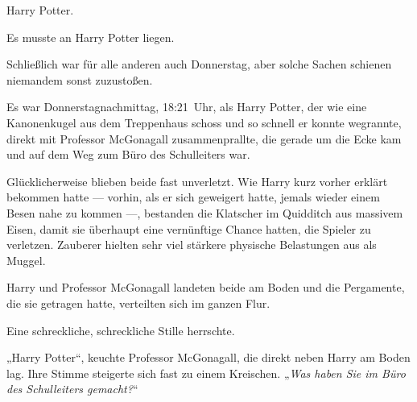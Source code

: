 \later

Harry Potter.

Es musste an Harry Potter liegen.

Schließlich war für alle anderen auch Donnerstag, aber solche Sachen schienen niemandem sonst zuzustoßen.

Es war Donnerstagnachmittag, 18:21~Uhr, als Harry Potter, der wie eine Kanonenkugel aus dem Treppenhaus schoss und so schnell er konnte wegrannte, direkt mit Professor McGonagall zusammenprallte, die gerade um die Ecke kam und auf dem Weg zum Büro des Schulleiters war.

Glücklicherweise blieben beide fast unverletzt. Wie Harry kurz vorher erklärt bekommen hatte — vorhin, als er sich geweigert hatte, jemals wieder einem Besen nahe zu kommen —, bestanden die Klatscher im Quidditch aus massivem Eisen, damit sie überhaupt eine vernünftige Chance hatten, die Spieler zu verletzen. Zauberer hielten sehr viel stärkere physische Belastungen aus als Muggel.

Harry und Professor McGonagall landeten beide am Boden und die Pergamente, die sie getragen hatte, verteilten sich im ganzen Flur.

Eine schreckliche, schreckliche Stille herrschte.

„Harry Potter“, keuchte Professor McGonagall, die direkt neben Harry am Boden lag. Ihre Stimme steigerte sich fast zu einem Kreischen.
„\emph{Was haben Sie im Büro des Schulleiters gemacht?}“

